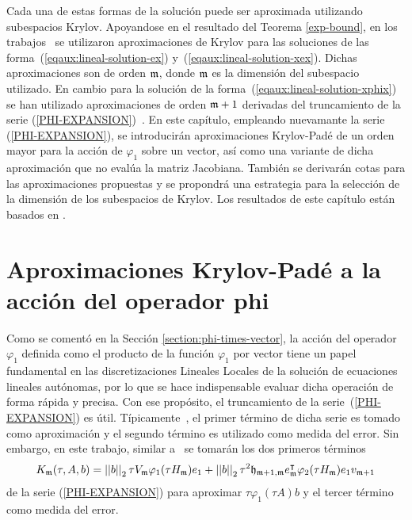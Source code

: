 Cada una de estas formas de la solución puede ser aproximada utilizando subespacios Krylov. Apoyandose en el resultado del Teorema \ref{exp-bound}, en los trabajos~\cite{hochbruck1998exponential,jimenez2012convergence} se utilizaron aproximaciones de Krylov para las soluciones de las forma~(\ref{eqaux:lineal-solution-ex}) y~(\ref{eqaux:lineal-solution-xex}). Dichas aproximaciones son de orden $\mathfrak{m}$, donde $\mathfrak{m}$ es la dimensión del subespacio utilizado. En cambio para la solución de la forma~(\ref{eqaux:lineal-solution-xphix}) se han utilizado aproximaciones de orden  $\mathfrak{m}+1$ derivadas del truncamiento de la serie (\ref{PHI-EXPANSION})~\cite{sidje1998expokit,niesen2012algorithm}. En este capítulo, empleando nuevamante la serie (\ref{PHI-EXPANSION}), se introducirán aproximaciones Krylov-Padé de un orden mayor para la acción de $\varphi_1$ sobre un vector, así como una variante de dicha aproximación que no evalúa la matriz Jacobiana. También se derivarán cotas para las aproximaciones propuestas y se propondrá una estrategia para la selección de la dimensión de los subespacios de Krylov. Los resultados de este capítulo están basados en \cite{naranjo2023computing,naranjo2023RT,naranjo2021locally,naranjo2023jacobian}.

\section{Aproximaciones Krylov-Padé a la acción del operador phi}\label{section:krylov-pade-approx}

Como se comentó en la Sección \ref{section:phi-times-vector}, la acción del operador $\varphi_1$ definida como el producto de la función $\varphi_1$ por vector tiene un papel fundamental en las discretizaciones Lineales Locales de la solución de ecuaciones lineales autónomas, por lo que se hace indispensable evaluar dicha operación de forma rápida y precisa. Con ese propósito, el truncamiento de la serie~(\ref{PHI-EXPANSION}) es útil. Típicamente~\cite{niesen2012algorithm,sidje1998expokit,tokman2006efficient}, el primer término de dicha serie es tomado como aproximación y el segundo término es utilizado como medida del error. Sin embargo, en este trabajo, similar a~\cite{Saad92} se tomarán los dos primeros términos
 \begin{equation}\label{exact-two-terms-km}
    K_{\mathfrak{m}}(\tau,A,b) = \left\lvert \left\lvert  b  \right\rvert \right\rvert_2\tau V_{\mathfrak{m}}\varphi_1(\tau H_{\mathfrak{m}})e_1 + \left\lvert \left\lvert  b  \right\rvert \right\rvert_2\tau^2\mathfrak{h}_{\mathfrak{m}+1,\mathfrak{m}}e^\intercal_{\mathfrak{m}}\varphi_2(\tau H_{\mathfrak{m}})e_1v_{\mathfrak{m}+1}
 \end{equation}
de la serie (\ref{PHI-EXPANSION}) para aproximar $\tau\varphi_1(\tau A)b$ y el tercer término como medida del error.


